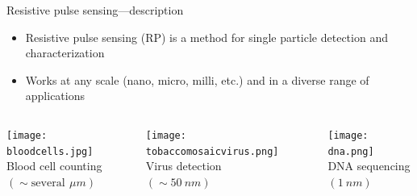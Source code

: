 \begin{frame}[c]{Resistive pulse sensing---description}
	
	
	
			\begin{itemize}
				\item Resistive pulse sensing (RP) is a method for single particle detection and characterization
				\item Works at any scale (nano, micro, milli, etc.) and in a diverse range of applications
			\end{itemize}
	

	\begin{columns}[t]
		\begin{column}[T]{1.67in}
			{\centering
				\texttt{[image: bloodcells.jpg]} \\
				Blood cell counting \\
				$\left(\sim\mathrm{several}\,\SI{}{\mu m}\right)$ \\
				\par
			}
		\end{column}
		
		\begin{column}[T]{1.67in}
			{\centering
				\texttt{[image: tobaccomosaicvirus.png]} \\
				Virus detection \\
				$\left(\sim\SI{50}{nm}\right)$ \\
				\par
			}
		\end{column}
		
		\begin{column}[T]{1.67in}
			{\centering
				\texttt{[image: dna.png]} \\
				DNA sequencing \\
				$\left(\SI{1}{nm}\right)$ \\
				\par
			}
		\end{column}

	\end{columns}

	
\end{frame}





